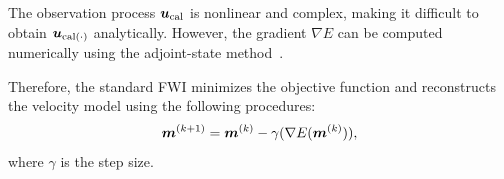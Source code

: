The observation process $\bm{u}_{\mathrm{cal}}$ is nonlinear and complex, making it difficult to obtain $\bm{u}_{\mathrm{cal}(\cdot)}$ analytically.
However, the gradient $\nabla E$ can be computed numerically using the adjoint-state method~\cite{FWI-gradient}.

Therefore, the standard FWI minimizes the objective function and reconstructs the velocity model using the following procedures:
\begin{equation} \label{eq:FWIWithGradient} \bm{m}^{(k+1)} = \bm{m}^{(k)} - \gamma( \nabla E(\bm{m}^{(k)}) ), \end{equation}
where $\gamma$ is the step size.

